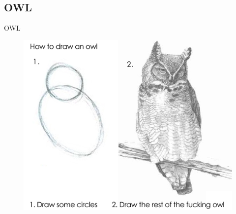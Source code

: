 \documentclass[aspectratio=169, professionalfonts]{beamer}
\begin{document}
\subsection{OWL}
\begin{frame}{OWL}
	\begin{figure}
		\includegraphics[width=.6\textwidth]{figures/how-to-draw-an-owl}
	\end{figure}
\end{frame}







\end{document}
